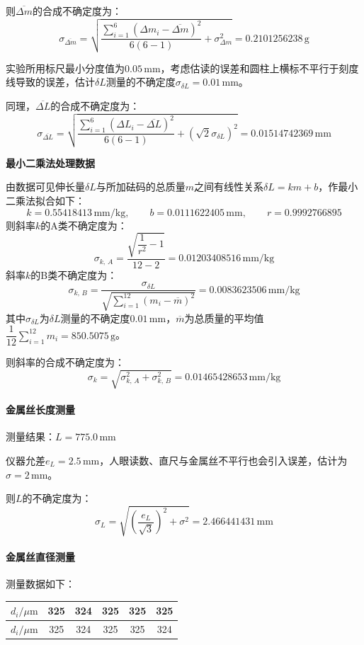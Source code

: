 \documentclass[a4paper,fontset=windows]{ctexart}
\begin{document}
    则$\overline{\Delta m}$的合成不确定度为：
    \[
    \sigma_{\overline{\Delta m}} = \sqrt{\frac{\sum\limits_{i=1}^{6}(\Delta m_i - \overline{\Delta m})^2}{6(6-1)} + \sigma_{\Delta m}^2} = 0.2101256238\,\mathrm{g}
    \]

    实验所用标尺最小分度值为$0.05\,\mathrm{mm}$，考虑估读的误差和圆柱上横标不平行于刻度线导致的误差，估计$\delta L$测量的不确定度$\sigma_{\delta L} = 0.01\,\mathrm{mm}$。

    同理，$\overline{\Delta L}$的合成不确定度为：
    \[
    \sigma_{\overline{\Delta L}} = \sqrt{\frac{\sum\limits_{i=1}^{6}(\Delta L_i - \overline{\Delta L})^2}{6(6-1)} + \left(\sqrt{2}\sigma_{\delta L}\right)^2} = 0.01514742369\,\mathrm{mm}
    \]

    \textbf{最小二乘法处理数据}

    由数据可见伸长量$\delta L$与所加砝码的总质量$m$之间有线性关系$\delta L = km+b$，作最小二乘法拟合如下：
    \[
    k=0.55418413\,\mathrm{mm/kg},\qquad b=0.0111622405\,\mathrm{mm},\qquad r=0.9992766895
    \]
    则斜率$k$的A类不确定度为：
    \[
    \sigma_{k,\, A} = \frac{\sqrt{\dfrac{1}{r^2}-1}}{12-2} = 0.01203408516\,\mathrm{mm/kg}
    \]
    斜率$k$的B类不确定度为：
    \[
    \sigma_{k,\, B} = \frac{\sigma_{\delta L}}{\sqrt{\sum\limits_{i=1}^{12}(m_i - \overline{m})^2}} = 0.0083623506\,\mathrm{mm/kg}
    \]
    其中$\sigma_{\delta L}$为$\delta L$测量的不确定度$0.01\,\mathrm{mm}$，$\overline{m}$为总质量的平均值$\dfrac{1}{12}\sum\limits_{i=1}^{12}m_i = 850.5075\,\mathrm{g}$。

    则斜率的合成不确定度为：
    \[
    \sigma_k = \sqrt{\sigma_{k,\, A}^2 + \sigma_{k,\, B}^2} = 0.01465428653\,\mathrm{mm/kg}
    \]

    \paragraph*{金属丝长度测量} 测量结果：$L = 775.0\,\mathrm{mm}$

    仪器允差$e_L = 2.5\,\mathrm{mm}$，人眼读数、直尺与金属丝不平行也会引入误差，估计为$\sigma = 2\,\mathrm{mm}$。

    则$L$的不确定度为：
    \[
    \sigma_L = \sqrt{\left(\frac{e_L}{\sqrt{3}}\right)^2 + \sigma^2} = 2.466441431\,\mathrm{mm}
    \]

    \paragraph*{金属丝直径测量} 测量数据如下：

    \begin{table}[ht!]
        \begin{center}
            \begin{tabular}{|c|c|c|c|c|c|}
                \hline
                $d_i/\mu\mathrm{m}$ & 325 & 324 & 325 & 325 & 325 \\
                \hline
                $d_i/\mu\mathrm{m}$ & 325 & 324 & 325 & 325 & 324 \\
                \hline
            \end{tabular}
        \end{center}
    \end{table}
    \vspace{-1.5em}
\end{document}
